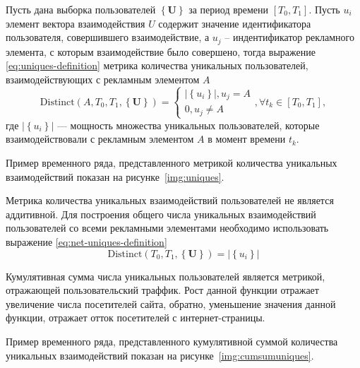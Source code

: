 Пусть дана выборка пользователей $\left\{ \mathbf{U} \right\}$ за период времени $\left[T_0, T_1\right]$. Пусть $u_i$
элемент вектора взаимодействия $U$ содержит значение идентификатора пользователя, совершившего взаимодействие, а $u_j$ -- 
индентификатор рекламного элемента, с которым взаимодействие было совершено, тогда выражение \eqref{eq:uniques-definition}
метрика количества уникальных пользователей, взаимодействующих с рекламным элементом $A$
\begin{equation}
    \text{Distinct}\left( A, T_0, T_1, \left\{\mathbf{U}\right\} \right) =
    \begin{cases}
        \left|\left\{u_i\right\}\right|, u_j = A  \\
        0, u_j \neq A
    \end{cases}, \forall t_k \in \left[T_0, T_1\right],
    \label{eq:uniques-definition}
\end{equation}
где $\left|\left\{u_i\right\}\right|$ --- мощность множества уникальных пользователей, которые взаимодействовали с рекламным
элементом $A$ в момент времени $t_k$.

Пример временного ряда, представленного метрикой количества уникальных взаимодействий показан на 
рисунке~\ref{img:uniques}.


Метрика количества уникальных взаимодействий пользователей не является аддитивной. Для построения общего числа уникальных
взаимодействий пользователей со всеми рекламными элементами необходимо использовать выражение \eqref{eq:net-uniques-definition}
\begin{equation}
    \text{Distinct}\left( T_0, T_1, \left\{\mathbf{U}\right\} \right) =\left|\left\{u_i\right\}\right| 
    \label{eq:net-uniques-definition}
\end{equation}

Кумулятивная сумма числа уникальных пользователей является метрикой, отражающей  пользовательский траффик. Рост данной
функции отражает увеличение числа посетителей сайта, обратно, уменьшение значения данной функции, отражает отток 
посетителей с интернет-страницы.

Пример временного ряда, представленного кумулятивной суммой количества уникальных взаимодействий показан на 
рисунке~\ref{img:cumsumuniques}.
